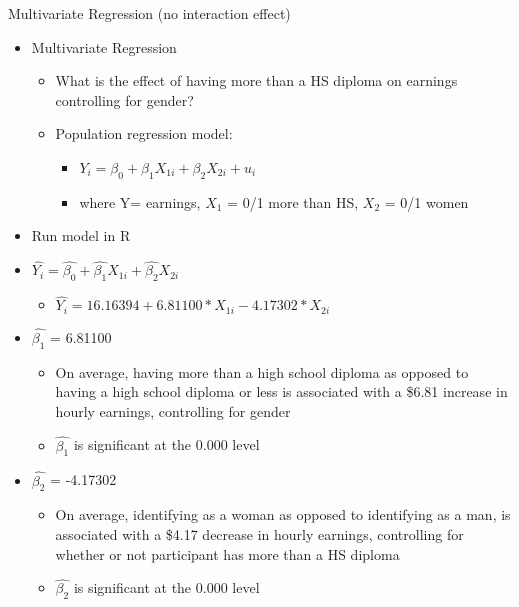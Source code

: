 \documentclass[8pt,ignorenonframetext,dvipsnames]{beamer}
\providecommand{\tightlist}{%
  \setlength{\itemsep}{0pt}\setlength{\parskip}{0pt}}
\let\olditem\item
\renewcommand{\item}{%
  \olditem\vspace{4pt}
}
\begin{document}
\begin{frame}{Multivariate Regression (no interaction effect)}
\protect\hypertarget{multivariate-regression-no-interaction-effect}{}

\begin{itemize}
\tightlist
\item
  Multivariate Regression

  \begin{itemize}
  \tightlist
  \item
    What is the effect of having more than a HS diploma on earnings
    controlling for gender?
  \item
    Population regression model:

    \begin{itemize}
    \tightlist
    \item
      \(Y_i = \beta_0 + \beta_1X_{1i} + \beta_2X_{2i} + u_i\)
    \item
      where Y= earnings, \(X_{1}\) = 0/1 more than HS, \(X_{2}\) = 0/1
      women
    \end{itemize}
  \end{itemize}
\item
  Run model in R
\item
  \(\hat{Y_i} = \hat{\beta_0} + \hat{\beta_1}X_{1i} + \hat{\beta_2}X_{2i}\)

  \begin{itemize}
  \tightlist
  \item
    \(\hat{Y_i} = 16.16394 + 6.81100*X_{1i} - 4.17302*X_{2i}\)
  \end{itemize}
\item
  \(\hat{\beta_1}\) = 6.81100

  \begin{itemize}
  \tightlist
  \item
    On average, having more than a high school diploma as opposed to
    having a high school diploma or less is associated with a \$6.81
    increase in hourly earnings, controlling for gender
  \item
    \(\hat{\beta_1}\) is significant at the 0.000 level
  \end{itemize}
\item
  \(\hat{\beta_2}\) = -4.17302

  \begin{itemize}
  \tightlist
  \item
    On average, identifying as a woman as opposed to identifying as a
    man, is associated with a \$4.17 decrease in hourly earnings,
    controlling for whether or not participant has more than a HS
    diploma
  \item
    \(\hat{\beta_2}\) is significant at the 0.000 level
  \end{itemize}
\end{itemize}

\end{frame}
\end{document}

